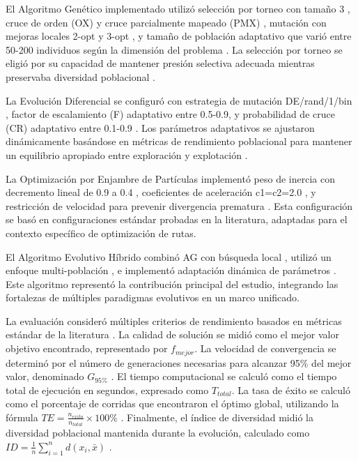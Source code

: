 \documentclass[12pt,a4paper]{article}
\begin{document}
El Algoritmo Genético implementado utilizó selección por torneo con tamaño 3 \cite{baker1985genetic}, cruce de orden (OX) y cruce parcialmente mapeado (PMX) \cite{oliver1987study}, mutación con mejoras locales 2-opt y 3-opt \cite{lin1973effective}, y tamaño de población adaptativo que varió entre 50-200 individuos según la dimensión del problema \cite{lobo2007parameter}. La selección por torneo se eligió por su capacidad de mantener presión selectiva adecuada mientras preservaba diversidad poblacional \cite{goldberg1991comparative}.

La Evolución Diferencial se configuró con estrategia de mutación DE/rand/1/bin \cite{storn1997differential}, factor de escalamiento (F) adaptativo entre 0.5-0.9, y probabilidad de cruce (CR) adaptativo entre 0.1-0.9 \cite{das2011differential}. Los parámetros adaptativos se ajustaron dinámicamente basándose en métricas de rendimiento poblacional para mantener un equilibrio apropiado entre exploración y explotación \cite{zhang2009jade}.

La Optimización por Enjambre de Partículas implementó peso de inercia con decremento lineal de 0.9 a 0.4 \cite{shi1998modified}, coeficientes de aceleración c1=c2=2.0 \cite{kennedy1995particle}, y restricción de velocidad para prevenir divergencia prematura \cite{clerc2002particle}. Esta configuración se basó en configuraciones estándar probadas en la literatura, adaptadas para el contexto específico de optimización de rutas.

El Algoritmo Evolutivo Híbrido combinó AG con búsqueda local \cite{moscato1989evolution}, utilizó un enfoque multi-población \cite{tanese1989distributed}, e implementó adaptación dinámica de parámetros \cite{meyer2007parameter}. Este algoritmo representó la contribución principal del estudio, integrando las fortalezas de múltiples paradigmas evolutivos en un marco unificado.

La evaluación consideró múltiples criterios de rendimiento basados en métricas estándar de la literatura \cite{birattari2006racing}. La calidad de solución se midió como el mejor valor objetivo encontrado, representado por $f_{mejor}$. La velocidad de convergencia se determinó por el número de generaciones necesarias para alcanzar 95\% del mejor valor, denominado $G_{95\%}$ \cite{wolpert1997no}. El tiempo computacional se calculó como el tiempo total de ejecución en segundos, expresado como $T_{total}$. La tasa de éxito se calculó como el porcentaje de corridas que encontraron el óptimo global, utilizando la fórmula $TE = \frac{n_{exito}}{n_{total}} \times 100\%$ \cite{derrac2011practical}. Finalmente, el índice de diversidad midió la diversidad poblacional mantenida durante la evolución, calculado como $ID = \frac{1}{n}\sum_{i=1}^{n}d(x_i, \bar{x})$ \cite{burke2013diversity}.
\end{document}
